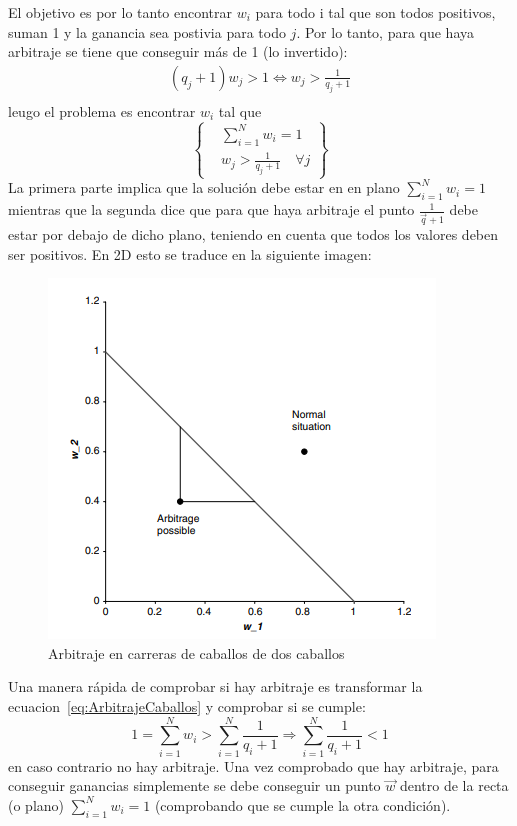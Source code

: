 El objetivo es por lo tanto encontrar $w_i$ para todo i tal que son todos positivos, suman 1 y la ganancia sea postivia para todo $j$. Por lo tanto, para que haya arbitraje se tiene que conseguir más de 1 (lo invertido):
\begin{align*}
    (q_j + 1)w_j > 1 \Leftrightarrow w_j > \frac{1}{q_j + 1} \\
\end{align*}
leugo el problema es encontrar $w_i$ tal que
\[
    \left\{
    \begin{aligned}\label{eq:ArbitrajeCaballos}
        &\sum_{i=1}^N w_i = 1 \\
        &w_j > \frac{1}{q_j + 1} \quad \forall j
    \end{aligned}
    \right\}
\]
La primera parte implica que la solución debe estar en en plano $\sum_{i=1}^N w_i = 1$ mientras que la segunda dice que para que haya arbitraje el punto $\frac{1}{\vec{q} + 1}$ debe estar por debajo de dicho plano, teniendo en cuenta que todos los valores deben ser positivos. En 2D esto se traduce en la siguiente imagen:
\begin{figure}[H]
    \centering
    \includegraphics[width=0.65\linewidth]{Imagenes/Parte1/3_Aleatoriedad/Arbitraje_Cabllos.png}
    \caption{Arbitraje en carreras de caballos de dos caballos}
\end{figure}

Una manera rápida de comprobar si hay arbitraje es transformar la ecuacion~\eqref{eq:ArbitrajeCaballos} y comprobar si se cumple:
\[
    1 = \sum_{i=1}^N w_i > \sum_{i=1}^N \frac{1}{q_i + 1} \Rightarrow  \boxed{\sum_{i=1}^N \frac{1}{q_i + 1} < 1}
\]
en caso contrario no hay arbitraje. Una vez comprobado que hay arbitraje, para conseguir ganancias simplemente se debe conseguir un punto $\vec{w}$ dentro de la recta (o plano) $\sum_{i=1}^N w_i = 1$ (comprobando que se cumple la otra condición).





